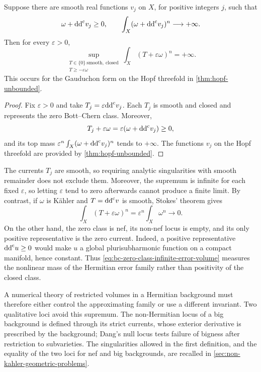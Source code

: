 \begin{proposition}\label{prop:bc-zero-class-infinite-error-volume}
Suppose there are smooth real functions $v_j$ on $X$, for positive integers $j$, such that
\[
 \omega+\mathrm{dd}^{\mathrm{c}} v_j\geq0,
 \qquad \int_X(\omega+\mathrm{dd}^{\mathrm{c}} v_j)^n\longrightarrow+\infty.
\]
Then for every $\varepsilon>0$,
\begin{equation}\label{eq:bc-zero-class-infinite-error-volume}
 \sup_{\substack{T\in\{0\}\ \mathrm{smooth,\ closed}\\
                          T\geq-\varepsilon\omega}}
       \int_X(T+\varepsilon\omega)^n=+\infty.
\end{equation}
This occurs for the Gauduchon form on the Hopf threefold in \cref{thm:hopf-unbounded}.
\end{proposition}
\begin{proof}
Fix $\varepsilon>0$ and take $T_j=\varepsilon\mathrm{dd}^{\mathrm{c}} v_j$. Each $T_j$ is smooth and closed and represents the zero Bott--Chern class. Moreover,
\[
 T_j+\varepsilon\omega
 =\varepsilon(\omega+\mathrm{dd}^{\mathrm{c}} v_j)\geq0,
\]
and its top mass $\varepsilon^n\int_X(\omega+\mathrm{dd}^{\mathrm{c}} v_j)^n$ tends to $+\infty$. The functions $v_j$ on the Hopf threefold are provided by \cref{thm:hopf-unbounded}.
\end{proof}

The currents $T_j$ are smooth, so requiring analytic singularities with smooth remainder does not exclude them. Moreover, the supremum is infinite for each fixed $\varepsilon$, so letting $\varepsilon$ tend to zero afterwards cannot produce a finite limit. By contrast, if $\omega$ is K\"ahler and $T=\mathrm{dd}^{\mathrm{c}} v$ is smooth, Stokes' theorem gives
\[
 \int_X(T+\varepsilon\omega)^n
 =\varepsilon^n\int_X\omega^n\longrightarrow0.
\]
On the other hand, the zero class is nef, its non-nef locus is empty, and its only positive representative is the zero current. Indeed, a positive representative $\mathrm{dd}^{\mathrm{c}} u\geq0$ would make $u$ a global plurisubharmonic function on a compact manifold, hence constant. Thus \eqref{eq:bc-zero-class-infinite-error-volume} measures the nonlinear mass of the Hermitian error family rather than positivity of the closed class.

A numerical theory of restricted volumes in a Hermitian background must therefore either control the approximating family or use a different invariant. Two qualitative loci avoid this supremum. The non-Hermitian locus of a big background is defined through its strict currents, whose exterior derivative is prescribed by the background; Dang's null locus tests failure of bigness after restriction to subvarieties. The singularities allowed in the first definition, and the equality of the two loci for nef and big backgrounds, are recalled in \cref{sec:non-kahler-geometric-problems}.

